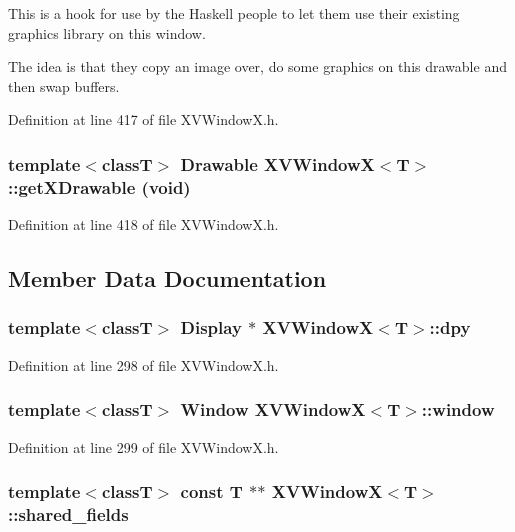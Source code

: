 This is a hook for use by the Haskell people to let them use their existing graphics library on this window.

The idea is that they copy an image over, do some graphics on this drawable and then swap buffers. 

Definition at line 417 of file XVWindow\-X.h.\label{XVWindowX_a21}
\hypertarget{class_XVWindowX_a21}{
\subsubsection[getXDrawable]{\setlength{\rightskip}{0pt plus 5cm}template$<$classT$>$ Drawable XVWindow\-X$<$T$>$::get\-XDrawable (void)}}




Definition at line 418 of file XVWindow\-X.h.

\subsection{Member Data Documentation}
\label{XVWindowX_n0}
\hypertarget{class_XVWindowX_n0}{
\subsubsection[dpy]{\setlength{\rightskip}{0pt plus 5cm}template$<$classT$>$ Display $\ast$ XVWindow\-X$<$T$>$::dpy}}




Definition at line 298 of file XVWindow\-X.h.\label{XVWindowX_n1}
\hypertarget{class_XVWindowX_n1}{
\subsubsection[window]{\setlength{\rightskip}{0pt plus 5cm}template$<$classT$>$ Window XVWindow\-X$<$T$>$::window}}




Definition at line 299 of file XVWindow\-X.h.\label{XVWindowX_n2}
\hypertarget{class_XVWindowX_n2}{
\subsubsection[shared_fields]{\setlength{\rightskip}{0pt plus 5cm}template$<$classT$>$ const T $\ast$$\ast$ XVWindow\-X$<$T$>$::shared\_\-fields}}




